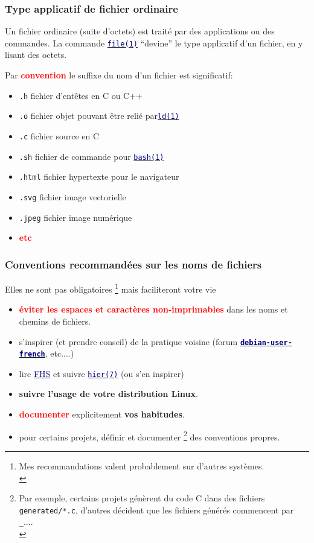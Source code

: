 \documentclass[lualatex,11pt,a4paper,svgnames,french]{beamer}
\newcommand{\clbhref}[2]{{\href{https:#1}{{\textcolor{Navy}{#2}}}}}
\newcommand{\clbman}[2]{{\href{https://man7.org/linux/man-pages/#1.html}{{\textcolor{Navy}{\texttt{#2}}}}}}
\newcommand{\clbrougras}[1]{{\textcolor{Red}{\textbf{#1}}}}
\begin{document}
\begin{frame}\frametitle{Type applicatif de fichier ordinaire}
  Un fichier ordinaire (suite d'octets) est traité par des applications ou des commandes.
  \bigskip
  La commande \clbman{man1/file.1}{file(1)} ``devine'' le type
  applicatif d'un fichier, en y lisant des octets.

  \smallskip

  Par \clbrougras{convention} le suffixe du nom d'un fichier est
  significatif:
  \begin{relsize}{-1}
  \begin{itemize}
  \item \texttt{.h} fichier d'entêtes en C ou C++
  \item \texttt{.o} fichier objet pouvant être relié par\clbman{man1/ld.1}{ld(1)}
  \item \texttt{.c} fichier source en C
  \item \texttt{.sh} fichier de commande pour  \clbman{man1/bash.1}{bash(1)}
  \item \texttt{.html} fichier hypertexte pour le navigateur
  \item \texttt{.svg} fichier image vectorielle
  \item \texttt{.jpeg} fichier image numérique
    \item \clbrougras{etc}
  \end{itemize}
  \end{relsize}
\end{frame}
\begin{frame}\frametitle{Conventions recommandées sur les noms de fichiers}

  Elles ne sont pas obligatoires \footnote{Mes recommandations valent probablement sur d'autres systèmes.\\} mais faciliteront votre vie

  \begin{itemize}
  \item \clbrougras{éviter les espaces et caractères non-imprimables}
    dans les noms et chemins de fichiers.
  \item s'inspirer (et prendre conseil) de la pratique voisine (forum
    \clbhref{//lists.debian.org/debian-user-french/}{
      \textbf{\texttt{debian-user-french}}}, etc....)
    \item lire 
      \clbhref{fr.wikipedia.org/wiki/Filesystem_Hierarchy_Standard}{FHS}
      et suivre \clbman{man7/hier.7}{hier(7)} (ou s'en inspirer)
  \item \textbf{suivre l'usage de votre distribution Linux}.
  \item \clbrougras{documenter} explicitement \textbf{vos habitudes}.
  \item pour certains projets, définir et documenter \footnote{Par
  exemple, certains projets génèrent du code C dans des fichiers
  \texttt{generated/*.c}, d'autres décident que les fichiers générés commencent par \texttt{\_}.... \medskip\\} des conventions propres.
  \end{itemize}
\end{frame}
\end{document}
